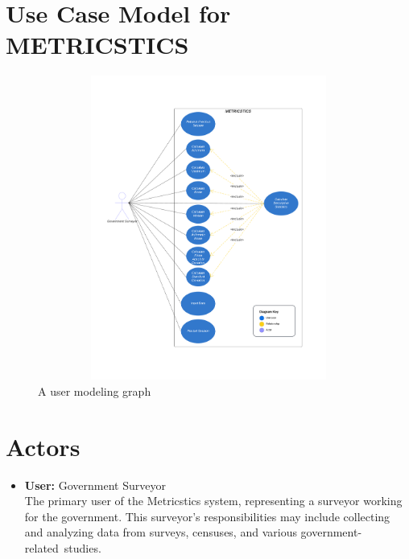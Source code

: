 \section{Use Case Model for METRICSTICS\\}
\begin{figure}[htp]
    \centering
    \includegraphics[width=12cm,height=10cm]{userModelingGraph.png}
    \renewcommand{\thefigure}{\arabic{figure}}
    \caption{A user modeling graph}
    \label{fig:figure1}
\end{figure}

\section{Actors}
\begin{itemize}
    \item \textbf{User:} Government Surveyor \\The primary user of the Metricstics system, representing a surveyor working for the government. This surveyor's responsibilities may include collecting and analyzing data from surveys, censuses, and various government-related studies.
\end{itemize}
\hfill \break



